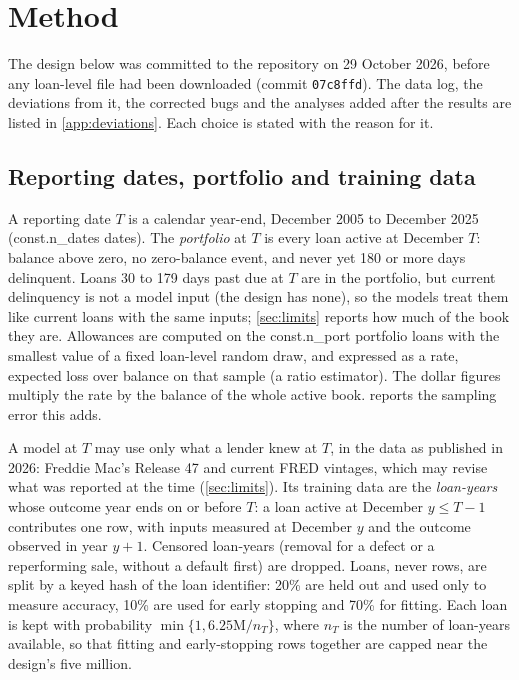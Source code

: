 \section{Method}\label{sec:method}

The design below was committed to the repository on 29 October 2026, before
any loan-level file had been downloaded (commit \texttt{07c8ffd}). The data log,
the deviations from it, the corrected bugs and the analyses added after the
results are listed in \cref{app:deviations}. Each choice is
stated with the reason for it.

\subsection{Reporting dates, portfolio and training data}

A reporting date $T$ is a calendar year-end, December 2005 to December 2025
(\num{const.n_dates} dates). The \emph{portfolio} at $T$ is every loan active
at December $T$: balance above zero, no zero-balance event, and never yet 180
or more days delinquent. Loans 30 to 179 days past due at $T$ are in the
portfolio, but current delinquency is not a model input (the design has
none), so the models treat them like current loans with the same inputs;
\cref{sec:limits} reports how much of the book they are. Allowances are computed on the \num{const.n_port}
portfolio loans with the smallest value of a fixed loan-level random draw,
and expressed as a rate, expected loss over balance on that sample (a ratio
estimator). The dollar figures multiply the rate by the balance of the whole
active book.  reports the sampling error this adds.

A model at $T$ may use only what a lender knew at $T$, in the data as
published in 2026: Freddie Mac's Release 47 and current FRED vintages, which
may revise what was reported at the time (\cref{sec:limits}). Its training data are
the \emph{loan-years} whose outcome year ends on or before $T$: a loan active
at December $y \le T-1$ contributes one row, with inputs measured at December
$y$ and the outcome observed in year $y+1$. Censored loan-years (removal for a
defect or a reperforming sale, without a default first) are dropped. Loans,
never rows, are split by a keyed hash of the loan identifier: 20\% are held
out and used only to measure accuracy, 10\% are used for early stopping and
70\% for fitting. Each loan is kept with probability
$\min\{1, 6.25\text{M}/n_T\}$, where $n_T$ is the number of loan-years
available, so that fitting and early-stopping rows together are capped near
the design's five million.

